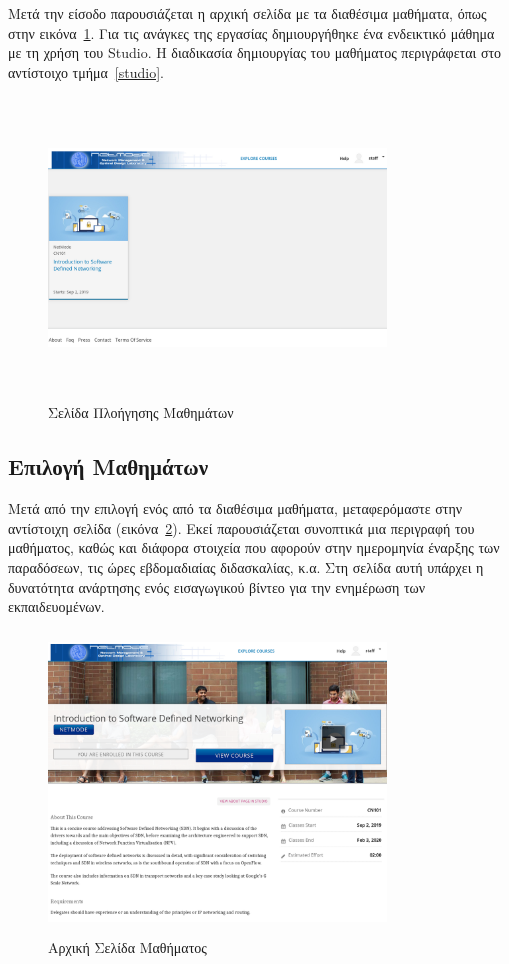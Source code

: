 \documentclass[12pt]{report}
\begin{document}
Μετά την είσοδο παρουσιάζεται η αρχική σελίδα με τα διαθέσιμα μαθήματα, όπως στην εικόνα~\ref{fig:microsite-explore-course}. Για τις ανάγκες της εργασίας δημιουργήθηκε ένα ενδεικτικό μάθημα με τη χρήση του \textlatin{Studio}. Η διαδικασία δημιουργίας του μαθήματος περιγράφεται στο αντίστοιχο τμήμα~\ref{studio}.
\begin{figure}[!htbp]
\centering
\includegraphics[width=0.8\textwidth, height=8cm]{microsite-explore-courses}
\caption{Σελίδα Πλοήγησης Μαθημάτων}
\label{fig:microsite-explore-course}
\end{figure}

\subsection{Επιλογή Μαθημάτων}
Μετά από την επιλογή ενός από τα διαθέσιμα μαθήματα, μεταφερόμαστε στην αντίστοιχη σελίδα (εικόνα~\ref{fig:microsite-course1}). Εκεί παρουσιάζεται συνοπτικά μια περιγραφή του μαθήματος, καθώς και διάφορα στοιχεία που αφορούν στην ημερομηνία έναρξης των παραδόσεων, τις ώρες εβδομαδιαίας διδασκαλίας, κ.α. Στη σελίδα αυτή υπάρχει η δυνατότητα ανάρτησης ενός εισαγωγικού βίντεο για την ενημέρωση των εκπαιδευομένων.
\begin{figure}[!htbp]
\centering
\includegraphics[width=0.8\textwidth, height=8cm]{microsite-course1}
\caption{Αρχική Σελίδα Μαθήματος}
\label{fig:microsite-course1}
\end{figure}
\end{document}
